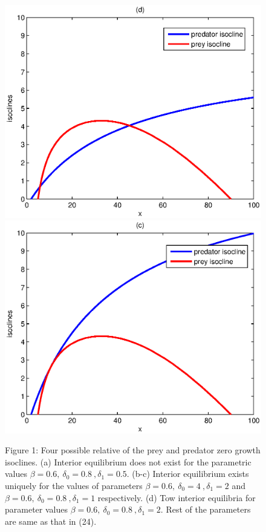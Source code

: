 \documentclass[a4paper, 10pt]{article}
\begin{document}
\begin{figure}[H]
		\endminipage\hfill
		{\includegraphics[scale=.6]{4.eps}}
		\endminipage\hfill
		{\includegraphics[scale=.6]{5.eps}}
		\endminipage\hfill
		\begin{center} Figure 1: Four possible relative of the prey and predator zero growth isoclines. (a) Interior equilibrium does not exist for the parametric values $\beta=0.6,~\delta_0=0.8~,\delta_1=0.5.$ (b-c) Interior equilibrium exists uniquely for the values of parameters $\beta=0.6,~\delta_0=4~,\delta_1=2$ and $\beta=0.6,~\delta_0=0.8~,\delta_1=1$ respectively. (d) Tow interior equilibria for parameter values $\beta=0.6,~\delta_0=0.8~,\delta_1=2.$ Rest of the parameters are same as that in (24).  \end{center}
	\end{figure}
\end{document}
